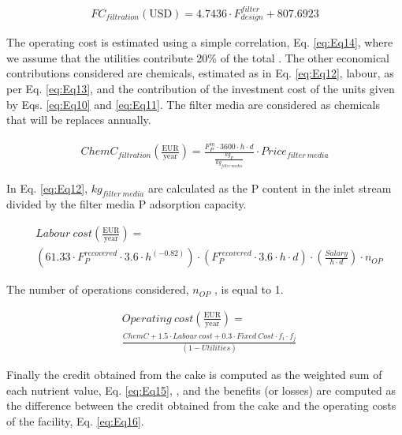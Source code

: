 \begin{refsection}[referencesCh2]
\begin{align}
	FC_{filtration}\left( \text{USD}  \right) = 4.7436\cdot F_{design}^{{filter}} + 807.6923 \label{eq:Eq11}
\end{align}

The operating cost is estimated using a simple correlation, Eq. \ref{eq:Eq14}, where we assume that the utilities contribute 20\% of the total \citep{vian1975pronostico}. The other economical contributions considered are chemicals, estimated as in Eq. \ref{eq:Eq12}, labour, as per Eq. \ref{eq:Eq13}, and the contribution of the investment cost of the units given by Eqs. \ref{eq:Eq10} and \ref{eq:Eq11}. The filter media are considered as chemicals that will be replaces annually.

\begin{align}
	{ChemC}_{filtration}\left(\frac{\text{EUR}}{\text{year}}\right) = 	\frac{F_{P}^{in} \cdot 3600 \cdot h \cdot d}{\frac{kg_P}{kg_{{filter \ media}}}} \cdot {Price}_{{filter \ media}} \label{eq:Eq12}
\end{align}

In Eq. \ref{eq:Eq12}, $kg_{{filter \ media}}$ are calculated as the P content in the inlet stream divided by the filter media P adsorption capacity.

\begin{align}
	& {{Labour \ cost}}\left( \frac{\text{EUR}}{\text{year}} \right) = \label{eq:Eq13} \\
	& \left( 61.33\cdot F_P^{recovered} \cdot 3.6\cdot{{{h}^{\left( { - 0.82} \right)}}} \right) \cdot \left( {F_P^{recovered} \cdot 3.6 \cdot h \cdot d} \right) \cdot \left( {\frac{{Salary}}{{h \cdot d}}} \right)\cdot{n_{OP}} \nonumber 
\end{align}

The number of operations considered, $n_{OP}$ , is equal to 1.

\begin{align}
	&{{Operating \ cost}}\left( \frac{\text{EUR}}{\text{year}} \right) = \label{eq:Eq14}\\ 
	&\frac{{{{ChemC}} + 1.5\cdot{{Labour \ cost}} + 0.3 \cdot Fixed \ Cost\cdot{f_i}\cdot{f_j}}}{{(1 - Utilities)}} \nonumber 
\end{align}

Finally the credit obtained from the cake is computed as the weighted sum of each nutrient value, Eq. \ref{eq:Eq15}, \citep{hernandez2017bio}, and the benefits (or losses) are computed as the difference between the credit obtained from the cake and the operating costs of the facility, Eq. \ref{eq:Eq16}.


\end{refsection}

